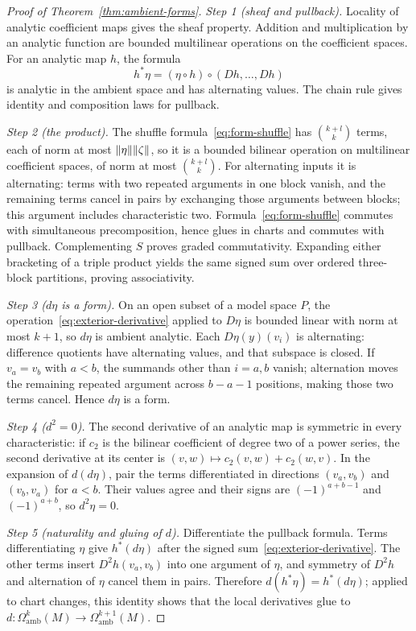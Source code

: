 \begin{proof}[Proof of Theorem~\ref{thm:ambient-forms}]
\emph{Step 1 (sheaf and pullback).} Locality of analytic coefficient maps gives the sheaf property. Addition and multiplication by an analytic function are bounded multilinear operations on the coefficient spaces. For an analytic map $h$, the formula
\[
 h^*\eta=(\eta\circ h)\circ(Dh,\ldots,Dh)
\]
is analytic in the ambient space and has alternating values. The chain rule gives identity and composition laws for pullback.

\emph{Step 2 (the product).} The shuffle formula~\eqref{eq:form-shuffle} has $\binom{k+l}{k}$ terms, each of norm at most $\lVert \eta\rVert\lVert \zeta\rVert$, so it is a bounded bilinear operation on multilinear coefficient spaces, of norm at most $\binom{k+l}{k}$. For alternating inputs it is alternating: terms with two repeated arguments in one block vanish, and the remaining terms cancel in pairs by exchanging those arguments between blocks; this argument includes characteristic two. Formula~\eqref{eq:form-shuffle} commutes with simultaneous precomposition, hence glues in charts and commutes with pullback. Complementing $S$ proves graded commutativity. Expanding either bracketing of a triple product yields the same signed sum over ordered three-block partitions, proving associativity.

\emph{Step 3 ($d\eta$ is a form).} On an open subset of a model space $P$, the operation~\eqref{eq:exterior-derivative} applied to $D\eta$ is bounded linear with norm at most $k+1$, so $d\eta$ is ambient analytic. Each $D\eta(y)(v_i)$ is alternating: difference quotients have alternating values, and that subspace is closed. If $v_a=v_b$ with $a<b$, the summands other than $i=a,b$ vanish; alternation moves the remaining repeated argument across $b-a-1$ positions, making those two terms cancel. Hence $d\eta$ is a form.

\emph{Step 4 ($d^2=0$).} The second derivative of an analytic map is symmetric in every characteristic: if $c_2$ is the bilinear coefficient of degree two of a power series, the second derivative at its center is $(v,w)\mapsto c_2(v,w)+c_2(w,v)$. In the expansion of $d(d\eta)$, pair the terms differentiated in directions $(v_a,v_b)$ and $(v_b,v_a)$ for $a<b$. Their values agree and their signs are $(-1)^{a+b-1}$ and $(-1)^{a+b}$, so $d^2\eta=0$.

\emph{Step 5 (naturality and gluing of $d$).} Differentiate the pullback formula. Terms differentiating $\eta$ give $h^*(d\eta)$ after the signed sum~\eqref{eq:exterior-derivative}. The other terms insert $D^2h(v_a,v_b)$ into one argument of $\eta$, and symmetry of $D^2h$ and alternation of $\eta$ cancel them in pairs. Therefore $d(h^*\eta)=h^*(d\eta)$; applied to chart changes, this identity shows that the local derivatives glue to $d\colon\Omega^k_{\mathrm{amb}}(M)\to\Omega^{k+1}_{\mathrm{amb}}(M)$.


\end{proof}
